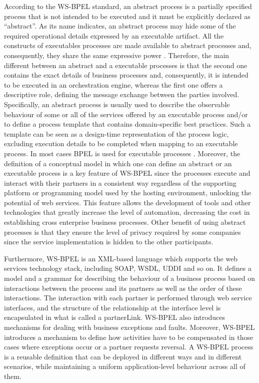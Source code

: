 According to the WS-BPEL standard, an  abstract process is a partially specified process that is not intended to be executed
and it must be explicitly declared as ``abstract''. As its name indicates, 
an abstract process may hide some of the required 
operational details expressed by an executable artifact.
All the constructs of executables processes are made available to abstract processes
and, consequently, they share the same expressive power \cite{wsbpelstandard}. 
Therefore, the main different between an abstract and a executable processes is 
that the second one contains the exact details of business processes and, consequently,
it is intended to be executed in an orchestration engine, whereas the first one offers a descriptive role,
defining the message exchange between the parties involved. Specifically, an abstract process is usually used to 
describe the observable behaviour of some or all of the services offered by an
executable process and/or to define a process template that contains domain-specific best practices. 
Such a template can be seen as a design-time representation of the process logic, excluding execution details to be
completed when mapping to an executable process.
In most cases BPEL is used for
executable processes \cite{}.
Moreover, the definition of a conceptual model in which one can define an abstract or an executable
process is a key feature of WS-BPEL since the processes execute and interact with their
partners in a consistent way regardless of the supporting platform or programming model used
by the hosting environment, unlocking the potential of
web services. This feature allows the development of tools and other technologies that greatly
increase the level of automation, decreasing the cost in establishing cross enterprise
business processes. Other benefit of using abstract processes is that they ensure 
the level of privacy required by some 
companies since the service implementation is hidden to the other participants. 

Furthermore, WS-BPEL is an XML-based language which
supports the web services technology stack, including SOAP, WSDL, UDDI and so on. 
It defines a model and a grammar for describing the behaviour of a business process
based on interactions between the process and its partners as well as the order of these interactions. 
The interaction with each partner is performed through web service interfaces, 
and the structure of the relationship at the interface level
is encapsulated in what is called a partnerLink. WS-BPEL also introduces 
mechanisms for dealing with business exceptions and faults. Moreover, WS-BPEL
introduces a mechanism to define how activities have to be compensated in those cases 
where exceptions occur or a partner requests reversal.
A WS-BPEL process is a reusable definition that can be deployed in different ways and in
different scenarios, while maintaining a uniform application-level behaviour across all of them.



